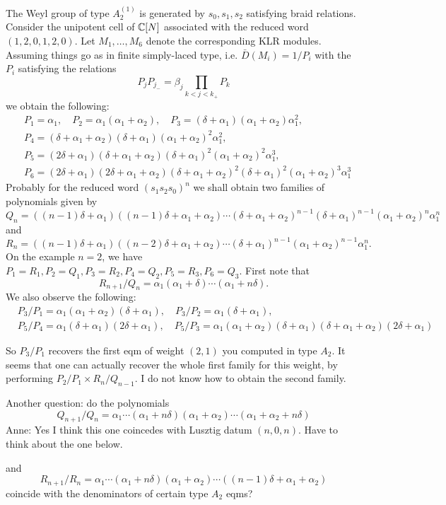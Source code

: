 \documentclass[11pt]{article}
\begin{document}
The Weyl group of type $A_2^{(1)}$ is generated by $s_0,s_1,s_2$ satisfying braid relations. 
Consider the unipotent cell of $\mathbb{C}[N]$ associated with the reduced word $(1,2,0,1,2,0)$. Let $M_1, \ldots , M_6$ denote the corresponding KLR modules. Assuming things go as in finite simply-laced type, i.e. $\bar{D}(M_i) = 1/P_i$ with the $P_i$ satisfying the relations 
$$ P_j P_{j_{-}} = \beta_j \prod_{k < j < k_{+}} P_k $$
we obtain the following:
$$
\begin{aligned}
  & P_1 = \alpha_1 , \quad  P_2 = \alpha_1(\alpha_1 + \alpha_2) , \quad   P_3 = (\delta + \alpha_1)(\alpha_1 + \alpha_2)\alpha_1^2 , \\
  & P_4 = (\delta + \alpha_1 + \alpha_2)(\delta + \alpha_1)(\alpha_1 + \alpha_2)^{2}\alpha_1^2 , \\
  & P_5 = (2 \delta  + \alpha_1)(\delta + \alpha_1 + \alpha_2)(\delta + \alpha_1)^{2}(\alpha_1 + \alpha_2)^{2}\alpha_1^{3} , \\
  & P_6 = (2 \delta  + \alpha_1)(2 \delta + \alpha_1 + \alpha_2)(\delta + \alpha_1 + \alpha_2)^{2}(\delta + \alpha_1)^{2}(\alpha_1 + \alpha_2)^{3}\alpha_1^{3}
\end{aligned}
$$
Probably for the reduced word $(s_1s_2s_0)^n$ we shall obtain two families of polynomials given by 
$$ Q_n = ((n-1) \delta  + \alpha_1)((n-1) \delta + \alpha_1 + \alpha_2) \cdots (\delta + \alpha_1 + \alpha_2)^{n-1}(\delta + \alpha_1)^{n-1}(\alpha_1 + \alpha_2)^{n}\alpha_1^{n} $$
and 
$$ R_n = ((n-1) \delta  + \alpha_1)((n-2) \delta + \alpha_1 + \alpha_2) \cdots (\delta + \alpha_1)^{n-1}(\alpha_1 + \alpha_2)^{n-1}\alpha_1^{n} . $$
On the example $n=2$, we have $P_1=R_1, P_2=Q_1, P_3=R_2, P_4=Q_2, P_5=R_3, P_6=Q_3$.
First note that 
$$ R_{n+1} / Q_n = \alpha_1(\alpha_1 + \delta) \cdots (\alpha_1 + n \delta) . $$
We also observe the following:
$$   
\begin{aligned}
  & P_3 / P_{1} = \alpha_1(\alpha_1 + \alpha_2)(\delta + \alpha_1), \quad  P_3 / P_2 = \alpha_1(\delta + \alpha_1), \\
  & P_5 / P_4 = \alpha_1(\delta + \alpha_1)(2 \delta + \alpha_1), \quad  P_5 / P_3 = \alpha_1(\alpha_1 + \alpha_2)(\delta + \alpha_1)(\delta + \alpha_1 + \alpha_2)(2 \delta + \alpha_1)
\end{aligned}
$$    
\bigskip    
     
So $P_3 / P_1$ recovers the first eqm of weight $(2,1)$ you computed in type $A_2$. It seems that one can actually recover the whole first family for this weight, by performing $P_2 / P_1 \times R_n / Q_{n-1}$. I do not know how to obtain the second family. 

Another question: do the polynomials 
$$Q_{n+1} / Q_n = \alpha_1 \cdots (\alpha_1 + n \delta)(\alpha_1 + \alpha_2) \cdots (\alpha_1 + \alpha_2 + n \delta)$$
{\color{blue}Anne: Yes I think this one coincedes with Lusztig datum $(n,0,n)$. Have to think about the one below.}

and 
$$R_{n+1} / R_n =   \alpha_1 \cdots  (\alpha_1 + n \delta)(\alpha_1 + \alpha_2) \cdots ((n-1) \delta + \alpha_1 + \alpha_2) $$
coincide with the denominators of certain type $A_2$ eqms? 
\end{document}
